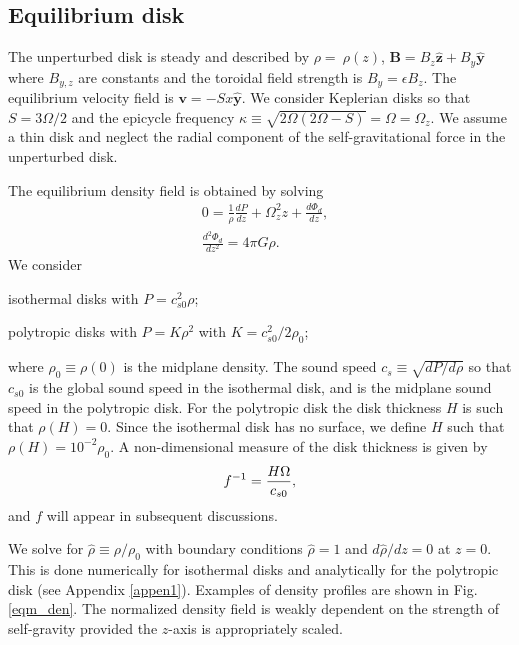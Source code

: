 \subsection{Equilibrium disk} 
The unperturbed disk is steady and described by
$\rho=~\rho(z)$, $\bm{B} = B_z\hat{\bm{z}} + B_y\hat{\bm{y}}$ where
$B_{y,z}$ are constants and the toroidal field strength is
$B_y=\epsilon B_z$. The equilibrium 
velocity field is $\bm{v} = -Sx\hat{\bm{y}}$. We consider Keplerian
disks so that $S = 3\Omega/2$ and the epicycle frequency 
$\kappa\equiv\sqrt{2\Omega(2\Omega-S)}=\Omega=\Omega_z$.  
We assume a thin disk and neglect the radial component of the
self-gravitational force in the unperturbed disk.    

The equilibrium density field is obtained by solving
\begin{align}
  &0=\frac{1}{\rho}\frac{d P}{dz} + \Omega_z^2z + \frac{d\Phi_d}{dz},\label{eqm_eqns1}\\
  &\frac{d^2\Phi_d}{dz^2} = 4\pi G \rho.\label{eqm_eqns2}
\end{align}
We consider \begin{inparaenum}[(i)]
\item isothermal disks with $P=c_{s0}^2\rho$\label{iso_eos}; 
\item polytropic disks with $P=K\rho^2$ with $K=c_{s0}^2/2\rho_0$;
\end{inparaenum}
where $\rho_0\equiv\rho(0)$ is the midplane density.
The sound speed $c_s\equiv\sqrt{dP/d\rho}$ 
so that $c_{s0}$ is the global sound speed in the isothermal disk, and
is the midplane sound speed in the polytropic disk. For the polytropic
disk the disk thickness $H$ is such that $\rho(H)=0$. Since the
isothermal disk has no surface, we define $H$ such that
$\rho(H)=10^{-2}\rho_0$. A non-dimensional
measure of the disk thickness is given by 
\begin{align}
  f^{-1} = \frac{H\Omega}{c_{s0}}, 
\end{align}
and $f$ will appear in subsequent discussions. 


We solve for $\hat{\rho}\equiv\rho/\rho_0$ with 
boundary conditions $\hat{\rho}=1$ and $d\hat{\rho}/dz=0$  at $z=0$. This
is done numerically for isothermal disks and analytically for the
polytropic disk (see Appendix \ref{appen1}). Examples of density
profiles are shown in Fig. \ref{eqm_den}. The normalized density field
is weakly dependent on the strength of self-gravity provided the
$z$-axis is appropriately scaled. 


